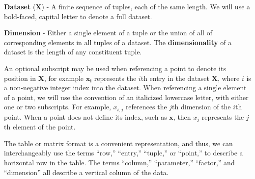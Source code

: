 \begin{defn}
  \textbf{Dataset} ($\mathbf{X}$) - A finite sequence of tuples, each of the same length. We will use a bold-faced, capital letter to denote a full dataset.
\end{defn}

\begin{defn}
  \textbf{Dimension} - Either a single element of a tuple or the union of all of corresponding elements in all tuples of a dataset. The \textbf{dimensionality} of a dataset is the length of any constituent tuple.
\end{defn}

An optional subscript may be used when referencing a point to denote its position in $\mathbf{X}$, for example $\mathbf{x_i}$ represents the $i$th entry in the dataset $\mathbf{X}$, where $i$ is a non-negative integer index into the dataset.
%
When referencing a single element of a point, we will use the convention of an italicized lowercase letter, with either one or two subscripts.
%
For example, $x_{i,j}$ references the $j$th dimension of the $i$th point.
%
When a point does not define its index, such as $\mathbf{x}$, then $x_j$ represents the $j$th element of the point.

The table or matrix format is a convenient representation, and thus, we can interchangeably use the terms ``row,'' ``entry,'' ``tuple,'' or ``point,'' to describe a horizontal row in the table.
%
The terms ``column,'' ``parameter,'' ``factor,'' and ``dimension'' all describe a vertical column of the data.

